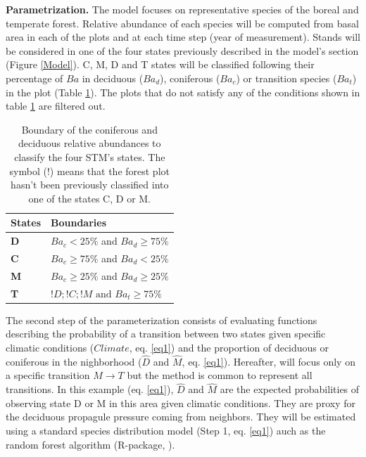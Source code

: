 \textbf{Parametrization.} The model focuses on representative species of the
boreal and temperate forest. Relative  abundance of each species will be
computed from basal area in each of the plots and at each time step (year of
measurement). Stands will be considered in one of the four states previously
described in the model's section (Figure \ref{Model}). C, M, D and T states
will be classified following their percentage of $Ba$ in deciduous ($Ba_d$),
coniferous ($Ba_c$) or transition species ($Ba_t$) in the plot (Table
\ref{bound}). The plots that do not satisfy any of the conditions shown in
table \ref{bound} are filtered out.\\

\begin{table}[h]
\centering
\caption{Boundary of the coniferous and deciduous relative abundances to classify the four STM's states. The symbol ($!$) means that the forest plot hasn't been previously classified into one of the states C, D or M.}
\begin{tabular}{ll}
	States  & Boundaries                            \\
	\hline
	\textbf{D} & $Ba_c< 25\%$ and $Ba_d \geq 75\%$    \\
	\textbf{C} & $Ba_c \geq 75\%$ and $Ba_d < 25\%$    \\
	\textbf{M} & $Ba_c \geq 25\%$ and $Ba_d \geq 25\%$ \\
	\textbf{T} & $!D;!C;!M \text{ and }  Ba_t  \geq 75\%$                                
\end{tabular}

\label{bound}
\end{table}

The second step of the parameterization consists of evaluating functions
describing the probability of a transition between two states given specific
climatic conditions ($Climate$, eq. \ref{eq1}) and the proportion of deciduous
or coniferous in the nighborhood ($\hat{D}$ and $\hat{M}$, eq. \ref{eq1}).
Hereafter, will focus only on a specific transition $M \rightarrow T$ but the
method is common to represent  all transitions. In this example (eq.
\ref{eq1}),  $\hat{D}$ and $\hat{M}$ are the expected probabilities of
observing state D or M in this area given climatic conditions. They are proxy
for the deciduous propagule pressure coming from neighbors. They will be
estimated using  a standard species distribution model (Step 1, eq. \ref{eq1})
auch as the random forest algorithm (R-package, \cite{Liaw2002a}).

